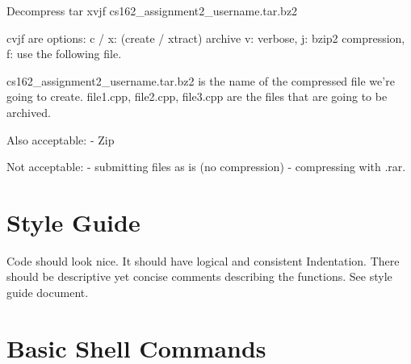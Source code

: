 \documentclass[letterpaper,10pt,titlepage,fleqn]{article}
\begin{document}
Decompress
tar xvjf cs162\_assignment2\_username.tar.bz2

cvjf are options: 
c / x:     (create / xtract) archive
v:     verbose, 
j:     bzip2 compression, 
f:     use the following file.

cs162\_assignment2\_username.tar.bz2 is the name of the compressed file we’re going to create. file1.cpp, file2.cpp, file3.cpp are the files that are going to be archived. 

Also acceptable: 
- Zip

Not acceptable: 
- submitting files as is (no compression) 
- compressing with .rar. 



\section{Style Guide}
Code should look nice. 
It should have logical and consistent Indentation. 
There should be descriptive yet concise comments describing the functions. 
    See style guide document.


\section{Basic Shell Commands}
\end{document}
